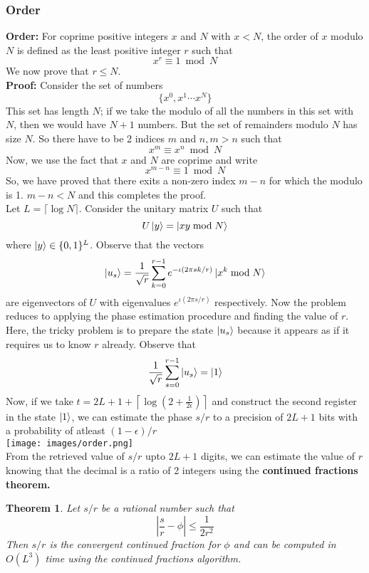 \documentclass{article}
\newtheorem{theorem}{Theorem}
\begin{document}
\subsubsection{Order}
\textbf{Order:} For coprime positive integers $x$ and $N$ with $x < N$, the order of $x$ modulo $N$ is defined as the least positive integer $r$ such that 
$$x^r \equiv 1\bmod{N}$$
We now prove that $r \leq N$. \\
\textbf{Proof:} Consider the set of numbers $$\{ x^0, x^1 \cdots x^N\}$$
This set has length $N$; if we take the modulo of all the numbers in this set with $N$, then we would have $N+1$ numbers. But the set of remainders modulo $N$ has size $N$. So there have to be 2 indices $m$ and $n, m>n$ such that $$x^m \equiv x^n\bmod{N}$$
Now, we use the fact that $x$ and $N$ are coprime and write $$x^{m-n} \equiv 1 \bmod{N}$$
So, we have proved that there exits a non-zero index $m-n$ for which the modulo is 1. $m-n < N$ and this completes the proof.\\[4pt]
Let $L = \lceil\log N \rceil$.
Consider the unitary matrix $U$ such that $$U\ket{y} = \ket{xy\bmod N}$$
where $\ket{y} \in \{0, 1 \}^L$. Observe that the vectors $$\ket{u_s} = \frac{1}{\sqrt{r}}\sum_{k=0}^{r-1} e^{-\iota(2\pi sk/r)}\ket{x^k \bmod{N}}$$
are eigenvectors of $U$ with eigenvalues $e^{\iota(2\pi s/r)}$ respectively. Now the problem reduces to applying the phase estimation procedure and finding the value of $r$. Here, the tricky problem is to prepare the state $\ket{u_s}$ because it appears as if it requires us to know $r$ already. Observe that $$\frac{1}{\sqrt{r}}\sum_{s=0}^{r-1}\ket{u_s} = \ket{1}$$
Now, if we take $t = 2L+1+ \left\lceil \log\left(2+\frac{1}{2\epsilon}\right) \right\rceil$ and construct the second register in the state $\ket{1}$, we can estimate the phase $s/r$ to a precision of $2L+1$ bits with a probability of atleast $(1-\epsilon)/r$\\[5pt]
\texttt{[image: images/order.png]}\\[3pt]
From the retrieved value of $s/r$ upto $2L+1$ digits, we can estimate the value of $r$ knowing that the decimal is a ratio of 2 integers using the \textbf{continued fractions theorem.} 
\begin{theorem}
Let $s/r$ be a rational number such that $$\left| \frac{s}{r}-\phi \right| \leq \frac{1}{2r^2}$$
Then $s/r$ is the convergent continued fraction for $\phi$ and can be computed in $O(L^3)$ time using the continued fractions algorithm.
\end{theorem}
\end{document}
